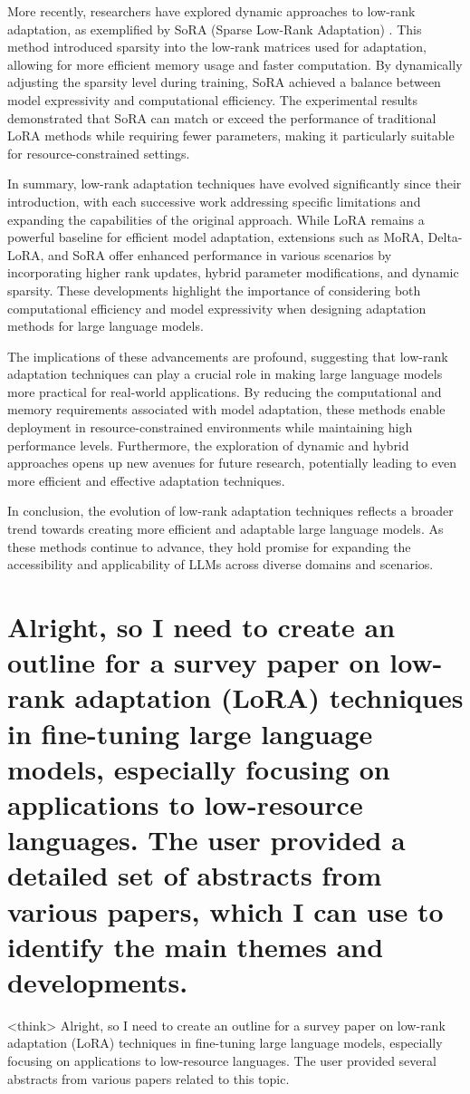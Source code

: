 \documentclass[conference]{IEEEtran}
\begin{document}
More recently, researchers have explored dynamic approaches to low-rank adaptation, as exemplified by SoRA (Sparse Low-Rank Adaptation) \cite{b4}. This method introduced sparsity into the low-rank matrices used for adaptation, allowing for more efficient memory usage and faster computation. By dynamically adjusting the sparsity level during training, SoRA achieved a balance between model expressivity and computational efficiency. The experimental results demonstrated that SoRA can match or exceed the performance of traditional LoRA methods while requiring fewer parameters, making it particularly suitable for resource-constrained settings.

In summary, low-rank adaptation techniques have evolved significantly since their introduction, with each successive work addressing specific limitations and expanding the capabilities of the original approach. While LoRA remains a powerful baseline for efficient model adaptation, extensions such as MoRA, Delta-LoRA, and SoRA offer enhanced performance in various scenarios by incorporating higher rank updates, hybrid parameter modifications, and dynamic sparsity. These developments highlight the importance of considering both computational efficiency and model expressivity when designing adaptation methods for large language models.

The implications of these advancements are profound, suggesting that low-rank adaptation techniques can play a crucial role in making large language models more practical for real-world applications. By reducing the computational and memory requirements associated with model adaptation, these methods enable deployment in resource-constrained environments while maintaining high performance levels. Furthermore, the exploration of dynamic and hybrid approaches opens up new avenues for future research, potentially leading to even more efficient and effective adaptation techniques.

In conclusion, the evolution of low-rank adaptation techniques reflects a broader trend towards creating more efficient and adaptable large language models. As these methods continue to advance, they hold promise for expanding the accessibility and applicability of LLMs across diverse domains and scenarios.

\section{Alright, so I need to create an outline for a survey paper on low-rank adaptation (LoRA) techniques in fine-tuning large language models, especially focusing on applications to low-resource languages. The user provided a detailed set of abstracts from various papers, which I can use to identify the main themes and developments.}
<think>
Alright, so I need to create an outline for a survey paper on low-rank adaptation (LoRA) techniques in fine-tuning large language models, especially focusing on applications to low-resource languages. The user provided several abstracts from various papers related to this topic.
\end{document}
